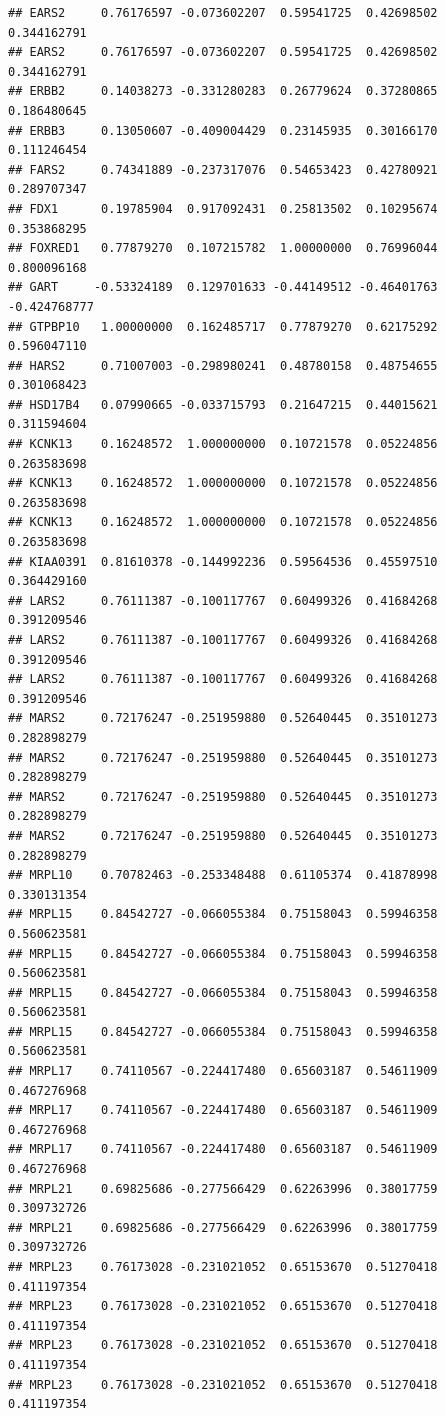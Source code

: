 \documentclass[
]{article}
\begin{document}
\begin{verbatim}
## EARS2     0.76176597 -0.073602207  0.59541725  0.42698502  0.344162791
## EARS2     0.76176597 -0.073602207  0.59541725  0.42698502  0.344162791
## ERBB2     0.14038273 -0.331280283  0.26779624  0.37280865  0.186480645
## ERBB3     0.13050607 -0.409004429  0.23145935  0.30166170  0.111246454
## FARS2     0.74341889 -0.237317076  0.54653423  0.42780921  0.289707347
## FDX1      0.19785904  0.917092431  0.25813502  0.10295674  0.353868295
## FOXRED1   0.77879270  0.107215782  1.00000000  0.76996044  0.800096168
## GART     -0.53324189  0.129701633 -0.44149512 -0.46401763 -0.424768777
## GTPBP10   1.00000000  0.162485717  0.77879270  0.62175292  0.596047110
## HARS2     0.71007003 -0.298980241  0.48780158  0.48754655  0.301068423
## HSD17B4   0.07990665 -0.033715793  0.21647215  0.44015621  0.311594604
## KCNK13    0.16248572  1.000000000  0.10721578  0.05224856  0.263583698
## KCNK13    0.16248572  1.000000000  0.10721578  0.05224856  0.263583698
## KCNK13    0.16248572  1.000000000  0.10721578  0.05224856  0.263583698
## KIAA0391  0.81610378 -0.144992236  0.59564536  0.45597510  0.364429160
## LARS2     0.76111387 -0.100117767  0.60499326  0.41684268  0.391209546
## LARS2     0.76111387 -0.100117767  0.60499326  0.41684268  0.391209546
## LARS2     0.76111387 -0.100117767  0.60499326  0.41684268  0.391209546
## MARS2     0.72176247 -0.251959880  0.52640445  0.35101273  0.282898279
## MARS2     0.72176247 -0.251959880  0.52640445  0.35101273  0.282898279
## MARS2     0.72176247 -0.251959880  0.52640445  0.35101273  0.282898279
## MARS2     0.72176247 -0.251959880  0.52640445  0.35101273  0.282898279
## MRPL10    0.70782463 -0.253348488  0.61105374  0.41878998  0.330131354
## MRPL15    0.84542727 -0.066055384  0.75158043  0.59946358  0.560623581
## MRPL15    0.84542727 -0.066055384  0.75158043  0.59946358  0.560623581
## MRPL15    0.84542727 -0.066055384  0.75158043  0.59946358  0.560623581
## MRPL15    0.84542727 -0.066055384  0.75158043  0.59946358  0.560623581
## MRPL17    0.74110567 -0.224417480  0.65603187  0.54611909  0.467276968
## MRPL17    0.74110567 -0.224417480  0.65603187  0.54611909  0.467276968
## MRPL17    0.74110567 -0.224417480  0.65603187  0.54611909  0.467276968
## MRPL21    0.69825686 -0.277566429  0.62263996  0.38017759  0.309732726
## MRPL21    0.69825686 -0.277566429  0.62263996  0.38017759  0.309732726
## MRPL23    0.76173028 -0.231021052  0.65153670  0.51270418  0.411197354
## MRPL23    0.76173028 -0.231021052  0.65153670  0.51270418  0.411197354
## MRPL23    0.76173028 -0.231021052  0.65153670  0.51270418  0.411197354
## MRPL23    0.76173028 -0.231021052  0.65153670  0.51270418  0.411197354

\end{verbatim}
\end{document}
